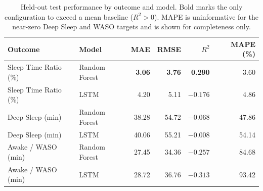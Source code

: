 \documentclass[fleqn,10pt]{wlscirep}
\begin{document}
\begin{table}[t]
\centering
\small
\begin{tabular}{@{}llrrrr@{}}
\toprule
Outcome & Model & MAE & RMSE & $R^2$ & MAPE (\%) \\
\midrule
Sleep Time Ratio (\%)   & Random Forest & \textbf{3.06}  & \textbf{3.76}  & \textbf{0.290}  & 3.60 \\
Sleep Time Ratio (\%)   & LSTM          & 4.20  & 5.11  & $-0.176$ & 4.86 \\
Deep Sleep (min)        & Random Forest & 38.28 & 54.72 & $-0.068$ & 47.86 \\
Deep Sleep (min)        & LSTM          & 40.06 & 55.21 & $-0.008$ & 54.14 \\
Awake / WASO (min)      & Random Forest & 27.45 & 34.36 & $-0.257$ & 84.68 \\
Awake / WASO (min)      & LSTM          & 28.72 & 36.76 & $-0.313$ & 93.42 \\
\bottomrule
\end{tabular}
\caption{\label{tab:perf}Held-out test performance by outcome and model. Bold marks the only configuration to exceed a mean baseline ($R^2 > 0$). MAPE is uninformative for the near-zero Deep Sleep and WASO targets and is shown for completeness only.}
\end{table}

\end{document}

